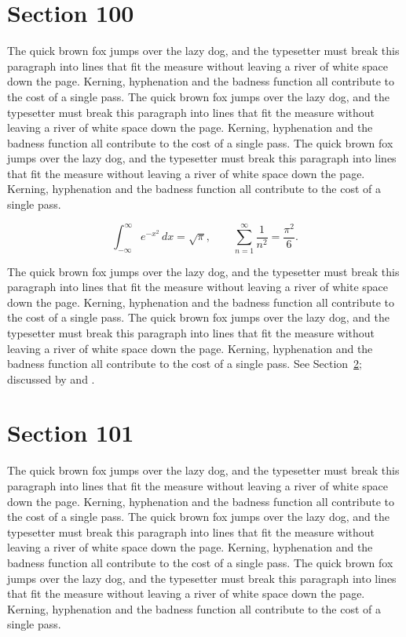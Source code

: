 \documentclass{article}
\begin{document}
\section{Section 100}
\label{sec:100}
The quick brown fox jumps over the lazy dog, and the typesetter must break this paragraph into lines that fit the measure without leaving a river of white space down the page. Kerning, hyphenation and the badness function all contribute to the cost of a single pass. The quick brown fox jumps over the lazy dog, and the typesetter must break this paragraph into lines that fit the measure without leaving a river of white space down the page. Kerning, hyphenation and the badness function all contribute to the cost of a single pass. The quick brown fox jumps over the lazy dog, and the typesetter must break this paragraph into lines that fit the measure without leaving a river of white space down the page. Kerning, hyphenation and the badness function all contribute to the cost of a single pass. 

\begin{equation}\label{eq:100}
\int_{-\infty}^{\infty} e^{-x^{2}}\,dx = \sqrt{\pi}, \qquad
\sum_{n=1}^{\infty} \frac{1}{n^{2}} = \frac{\pi^{2}}{6}.
\end{equation}

The quick brown fox jumps over the lazy dog, and the typesetter must break this paragraph into lines that fit the measure without leaving a river of white space down the page. Kerning, hyphenation and the badness function all contribute to the cost of a single pass. The quick brown fox jumps over the lazy dog, and the typesetter must break this paragraph into lines that fit the measure without leaving a river of white space down the page. Kerning, hyphenation and the badness function all contribute to the cost of a single pass. 
See Section~\ref{sec:101}; discussed by \textcite{k1} and \textcite{l3}.
\section{Section 101}
\label{sec:101}
The quick brown fox jumps over the lazy dog, and the typesetter must break this paragraph into lines that fit the measure without leaving a river of white space down the page. Kerning, hyphenation and the badness function all contribute to the cost of a single pass. The quick brown fox jumps over the lazy dog, and the typesetter must break this paragraph into lines that fit the measure without leaving a river of white space down the page. Kerning, hyphenation and the badness function all contribute to the cost of a single pass. The quick brown fox jumps over the lazy dog, and the typesetter must break this paragraph into lines that fit the measure without leaving a river of white space down the page. Kerning, hyphenation and the badness function all contribute to the cost of a single pass. 
\end{document}
